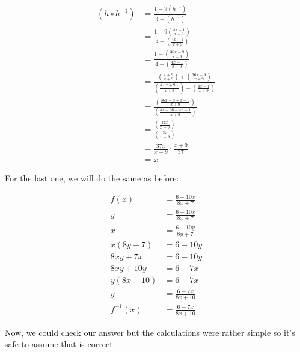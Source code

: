 \documentclass[12pt]{article}
\begin{document}
\begin{align}
    (h \circ h^{-1}) & = \frac{1+9(h^{-1})}{4-(h^{-1})}                                                                                                    \\
                     & = \frac{1+9\left(\frac{4x-1}{x+9}\right)}{4-\left(\frac{4x-1}{x+9}\right)}                                                          \\
                     & = \frac{1+\left(\frac{36x-9}{x+9}\right)}{4-\left(\frac{4x-1}{x+9}\right)}                                                          \\
                     & = \frac{\left(\frac{x+9}{x+9}\right)+\left(\frac{36x-9}{x+9}\right)}{\left(\frac{4(x+9)}{x+9}\right)-\left(\frac{4x-1}{x+9}\right)} \\
                     & = \frac{\left(\frac{36x-9+x+9}{x+9}\right)}{\left(\frac{4x+36-4x+1}{x+9}\right)}                                                    \\
                     & = \frac{\left(\frac{37x}{x+9}\right)}{\left(\frac{37}{x+9}\right)}                                                                  \\
                     & = \frac{37x}{x+9} \cdot \frac{x+9}{37}                                                                                              \\
                     & = x
\end{align}

For the last one, we will do the same as before:

\begin{align}
    f(x)       & = \frac{6-10x}{8x+7}   \\
    y          & = \frac{6-10x}{8x+7}   \\
    x          & = \frac{6-10y}{8y+7}   \\
    x(8y+7)    & = 6-10y                \\
    8xy + 7x   & = 6-10y                \\
    8xy + 10y  & = 6-7x                 \\
    y(8x + 10) & = 6-7x                 \\
    y          & = \frac{6-7x}{8x + 10} \\
    f^{-1}(x)  & = \frac{6-7x}{8x + 10}
\end{align}

Now, we could check our answer but the calculations were rather simple so it's safe to assume that is correct.
\end{document}
